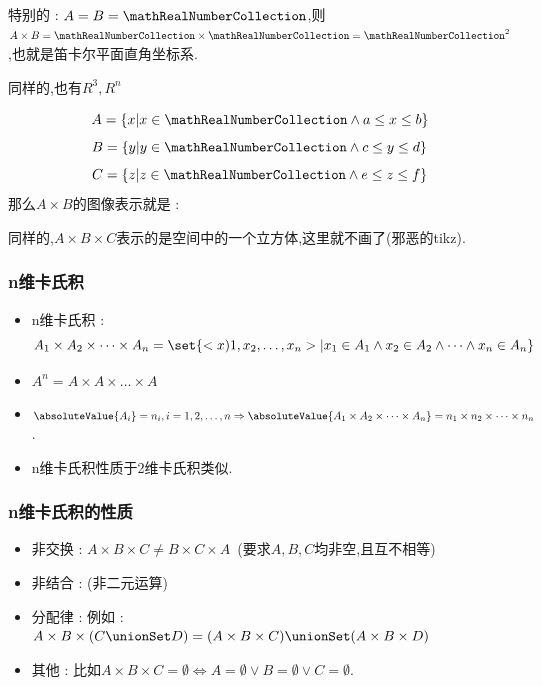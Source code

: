 {{{  特别的 : $A = B = \mathRealNumberCollection$,则$A \times B = \mathRealNumberCollection \times \mathRealNumberCollection = \mathRealNumberCollection^2$,也就是笛卡尔平面直角坐标系.

  同样的,也有$R^3,R^n$


  $$
    A = \{x | x \in \mathRealNumberCollection \land a \leq x \leq b\}
  $$
  $$
    B = \{y | y \in \mathRealNumberCollection \land c \leq y \leq d\}
  $$
  $$
    C = \{z | z \in \mathRealNumberCollection \land e \leq z \leq f\}
  $$
  那么$A \times B$的图像表示就是 :
  \begin{center}
  \end{center}

  同样的,$A \times B \times C$表示的是空间中的一个立方体,这里就不画了(邪恶的tikz).
}%

\subsubsection{n维卡氏积}{
  \begin{itemize}
    \item n维卡氏积 : $$
            A_1 \times A_2 \times \dots \times A_n = \set{<x)1,x_2,\dots,x_n> | x_1 \in A_1 \land x_2 \in A_2 \land \dots \land x_n \in A_n}
          $$
    \item $A^n = A \times A \times \dots \times A$
    \item $\absoluteValue{A_i} = n_i,i = 1,2,\dots,n \Rightarrow \absoluteValue{A_1 \times A_2 \times \dots \times A_n} = n_1 \times n_2 \times \dots \times n_n$.
    \item n维卡氏积性质于2维卡氏积类似.
  \end{itemize}
}%

\subsubsection{n维卡氏积的性质}{
  \begin{itemize}
    \item 非交换 : $A \times B \times C \neq B \times C \times A$\ (要求$A,B,C$均非空,且互不相等)
    \item 非结合 : (非二元运算)
    \item 分配律 : 例如 : $A \times B \times (C \unionSet D) = (A \times B \times C) \unionSet (A \times B \times D)$
    \item 其他 : 比如$A \times B \times C = \emptyset \Leftrightarrow A = \emptyset \lor B = \emptyset \lor C = \emptyset$.
  \end{itemize}
}%

}}
